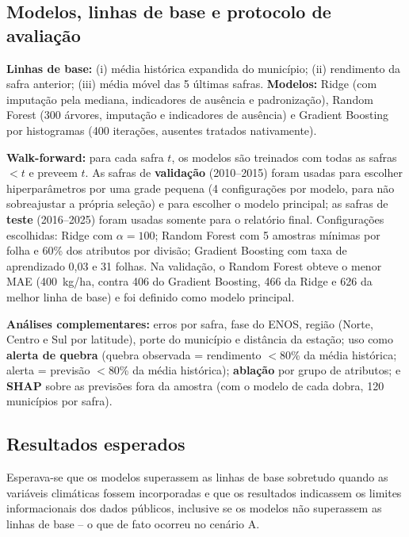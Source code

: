 \documentclass[12pt]{article}
\begin{document}
\subsection{Modelos, linhas de base e protocolo de avaliação}

\textbf{Linhas de base:} (i) média histórica expandida do município; (ii)
rendimento da safra anterior; (iii) média móvel das 5 últimas safras.
\textbf{Modelos:} Ridge (com imputação pela mediana, indicadores de
ausência e padronização), Random Forest (300 árvores, imputação e
indicadores de ausência) e Gradient Boosting por histogramas (400
iterações, ausentes tratados nativamente).

\textbf{Walk-forward:} para cada safra $t$, os modelos são treinados com
todas as safras $<t$ e preveem $t$. As safras de \textbf{validação}
(2010--2015) foram usadas para escolher hiperparâmetros por uma grade
pequena (4 configurações por modelo, para não sobreajustar a própria
seleção) e para escolher o modelo principal; as safras de \textbf{teste}
(2016--2025) foram usadas somente para o relatório final. Configurações
escolhidas: Ridge com $\alpha=100$; Random Forest com 5 amostras mínimas
por folha e 60\% dos atributos por divisão; Gradient Boosting com taxa de
aprendizado 0,03 e 31 folhas. Na validação, o Random Forest obteve o menor
MAE (400~kg/ha, contra 406 do Gradient Boosting, 466 da Ridge e 626 da
melhor linha de base) e foi definido como modelo principal.

\textbf{Análises complementares:} erros por safra, fase do ENOS, região
(Norte, Centro e Sul por latitude), porte do município e distância da
estação; uso como \textbf{alerta de quebra} (quebra observada = rendimento
$<$80\% da média histórica; alerta = previsão $<$80\% da média histórica);
\textbf{ablação} por grupo de atributos; e \textbf{SHAP} sobre as previsões
fora da amostra (com o modelo de cada dobra, 120 municípios por safra).

\subsection{Resultados esperados}

Esperava-se que os modelos superassem as linhas de base sobretudo quando as
variáveis climáticas fossem incorporadas e que os resultados indicassem os
limites informacionais dos dados públicos, inclusive se os modelos não
superassem as linhas de base -- o que de fato ocorreu no cenário A.

\end{document}
